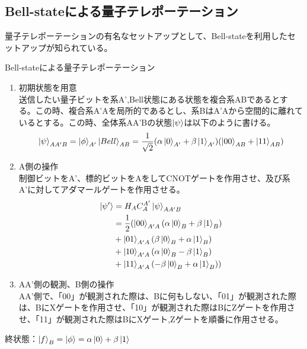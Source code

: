 \documentclass[a4paper,10.5pt]{article}
\numberwithin{equation}{section}
\begin{document}
\subsection{Bell-stateによる量子テレポーテーション}
量子テレポーテーションの有名なセットアップとして、Bell-stateを利用したセットアップが知られている。\\
\begin{setupbox}{Bell-stateによる量子テレポーテーション}
\begin{enumerate}
    \item 初期状態を用意\\
    送信したい量子ビットを系A',Bell状態にある状態を複合系ABであるとする。この時、複合系A'Aを局所的であるとし、系BはA'Aから空間的に離れているとする。この時、全体系AA'Bの状態$\ket{\psi}$は以下のように書ける。
\begin{equation}\begin{split}
    \ket{\psi}_{AA'B} =\ket{\phi}_{A'}\ket{Bell}_{AB} 
    =\frac{1}{\sqrt{2}} (\alpha\ket{0}_{A'}+\beta \ket{1}_{A'})(\ket{00}_{AB}+\ket{11}_{AB})
\end{split} \end{equation}
    \item A側の操作\\
    制御ビットをA'、標的ビットをAをしてCNOTゲートを作用させ、及び系A'に対してアダマールゲートを作用させる。
\begin{equation}\begin{split}
    \ket{\psi'}&=H_{A}C_{A}^{A'}\ket{\psi}_{AA'B}\\&=\frac{1}{2}(\ket{00}_{A'A}(\alpha \ket{0}_{B}+\beta \ket{1}_{B})
    \\&+\ket{01}_{A'A}(\beta \ket{0}_{B}+\alpha \ket{1}_{B})\\
    &+\ket{10}_{A'A}(\alpha \ket{0}_{B}-\beta \ket{1}_{B})\\
    &+\ket{11}_{A'A}(-\beta \ket{0}_{B}+\alpha \ket{1}_{B}))
\end{split} \end{equation}
    \item AA'側の観測、B側の操作\\
    AA'側で、「00」が観測された際は、Bに何もしない、「01」が観測された際は、BにXゲートを作用させ、「10」が観測された際はBにZゲートを作用させ、「11」が観測された際はBにXゲート,Zゲートを順番に作用させる。
\end{enumerate}
終状態：$\ket{f}_{B}=\ket{\phi}=\alpha\ket{0}+\beta\ket{1}$
\end{setupbox}
\end{document}
